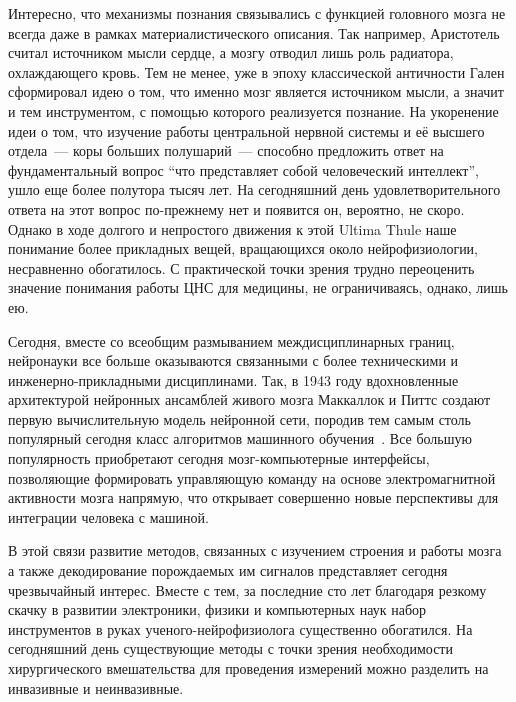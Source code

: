 Интересно, что механизмы познания связывались с функцией головного мозга не
всегда даже в рамках материалистического описания. Так например, Аристотель
считал источником мысли сердце, а мозгу отводил лишь роль радиатора,
охлаждающего кровь. Тем не менее, уже в эпоху классической античности Гален
сформировал идею о том, что именно мозг является источником мысли, а значит и
тем инструментом, с помощью которого реализуется познание.  На укоренение идеи
о том, что изучение работы центральной нервной системы и её высшего отдела~---
коры больших полушарий~--- способно предложить ответ на фундаментальный вопрос
“что представляет собой человеческий интеллект”, ушло еще более полутора тысяч
лет.  На сегодняшний день удовлетворительного ответа на этот вопрос по-прежнему
нет и появится он, вероятно, не скоро. Однако в ходе  долгого и непростого
движения к этой Ultima Thule наше понимание более прикладных вещей, вращающихся
около нейрофизиологии, несравненно обогатилось.  С практической точки зрения
трудно переоценить значение понимания работы ЦНС для медицины, не
ограничиваясь, однако, лишь ею.

Сегодня, вместе со всеобщим размыванием междисциплинарных границ, нейронауки
все больше оказываются связанными с более техническими и инженерно-прикладными
дисциплинами.  Так, в 1943 году вдохновленные архитектурой нейронных ансамблей
живого мозга Маккаллок и Питтс создают первую вычислительную модель нейронной
сети, породив тем самым столь популярный сегодня класс алгоритмов машинного
обучения~\cite{McCulloch}. Все большую популярность приобретают сегодня
мозг-компьютерные интерфейсы, позволяющие формировать управляющую команду на
основе электромагнитной активности мозга напрямую, что открывает совершенно
новые перспективы для интеграции человека с машиной.


В этой связи развитие методов, связанных с изучением строения и работы мозга а
также декодирование порождаемых им сигналов представляет сегодня чрезвычайный
интерес.  Вместе с тем, за последние сто лет благодаря резкому скачку в
развитии электроники, физики и компьютерных наук набор инструментов в руках
ученого-нейрофизиолога существенно обогатился.  На сегодняшний день
существующие методы с точки зрения необходимости хирургического вмешательства
для проведения измерений можно разделить на инвазивные и неинвазивные.

